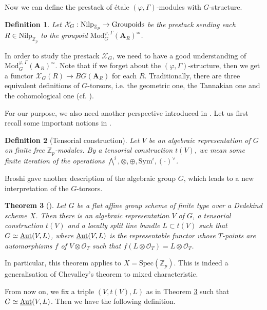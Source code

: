 \documentclass[10pt]{article}
\newtheorem{thm}{Theorem}[section]
\newtheorem{dfn}[thm]{Definition}
\numberwithin{equation}{section}
\newcommand{\bZ}{{\mathbb Z}}
\newcommand{\calO}{{\mathcal O}}
\newcommand{\calX}{{\mathcal X}}
\newcommand{\Mod}{{\mathrm{Mod}}}           %
\newcommand{\Spec}{{\mathrm{Spec}}}         %
\newcommand{\Sym}{{\mathrm{Sym}}}           %
\newcommand{\Nilp}{\mathrm{Nilp}}
\newcommand{\bfA}{{\textbf{A}}}
\begin{document}
Now we can define the prestack of  \'etale $(\varphi,\Gamma)$-modules with $G$-structure.
\begin{dfn}
    Let $\calX_G: \Nilp_{\bZ_p}\to {\rm Groupoids}$ be the prestack sending each $R\in \Nilp_{\bZ_p}$ to the groupoid $\Mod^{\varphi,\Gamma}_{G}(\bfA_R)^{\simeq}$.
\end{dfn}



In order to study the prestack $\calX_G$, we need to have a good understanding of $\Mod^{\varphi,\Gamma}_{G}(\bfA_R)^{\simeq}$. Note that if we forget about the $(\varphi,\Gamma)$-structure, then we get a functor $\calX_G(R)\to BG(\bfA_R)$ for each $R$. Traditionally, there are three equivalent definitions of $G$-torsors, i.e. the geometric one, the Tannakian one and the cohomological one (cf. \cite[Appendix to Lecture 19]{WS20}).

For our purpose, we also need another perspective introduced in \cite{Bro13}. Let us first recall some important notions in \cite{Bro13}.

\begin{dfn}[Tensorial construction]
   Let $V$ be an algebraic representation of $G$ on finite free $\bZ_p$-modules. By a tensorial construction $t(V)$, we mean some finite iteration of the operations $\bigwedge^i, \otimes, \oplus, \Sym^i, (\cdot)^{\vee}$.
\end{dfn}

Broshi gave another description of the algebraic group $G$, which leads to a new interpretation of the $G$-torsors.

\begin{thm}[{\cite[Theorem 1.1]{Bro13}}]\label{Broshi-G}
Let $G$ be a flat affine group scheme of finite type over a Dedekind scheme $X$. Then there is an algebraic representation $V$ of $G$, a tensorial construction $t(V)$ and a locally split line bundle $L\subset t(V)$ such that $G\simeq \underline{\mathrm{Aut}}(V,L)$, where $\underline{\mathrm{Aut}}(V,L)$ is the representable functor whose $T$-points are automorphisms $f$ of $V\otimes \calO_T$ such that $f(L\otimes \calO_T)=L\otimes \calO_T$.
\end{thm}

In particular, this theorem applies to $X=\Spec(\bZ_p)$. This is indeed a generalisation of Chevalley's theorem to mixed characteristic.

From now on, we fix a triple $(V,t(V),L)$ as in Theorem \ref{Broshi-G} such that $G\simeq \underline{\mathrm{Aut}}(V,L)$. Then we have the following definition.
\end{document}
